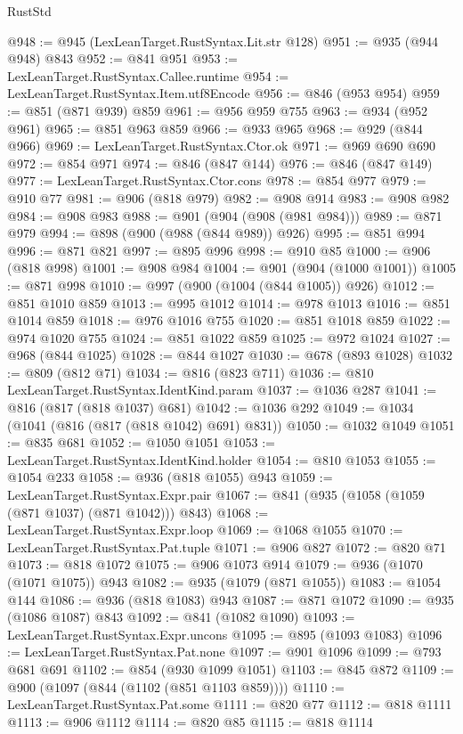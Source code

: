 \begin{lexlean}{RustStd}
\begin{coremodule}
@948 := @945 (LexLeanTarget.RustSyntax.Lit.str @128)
@951 := @935 (@944 @948) @843
@952 := @841 @951
@953 := LexLeanTarget.RustSyntax.Callee.runtime
@954 := LexLeanTarget.RustSyntax.Item.utf8Encode
@956 := @846 (@953 @954)
@959 := @851 (@871 @939) @859
@961 := @956 @959 @755
@963 := @934 (@952 @961)
@965 := @851 @963 @859
@966 := @933 @965
@968 := @929 (@844 @966)
@969 := LexLeanTarget.RustSyntax.Ctor.ok
@971 := @969 @690 @690
@972 := @854 @971
@974 := @846 (@847 @144)
@976 := @846 (@847 @149)
@977 := LexLeanTarget.RustSyntax.Ctor.cons
@978 := @854 @977
@979 := @910 @77
@981 := @906 (@818 @979)
@982 := @908 @914
@983 := @908 @982
@984 := @908 @983
@988 := @901 (@904 (@908 (@981 @984)))
@989 := @871 @979
@994 := @898 (@900 (@988 (@844 @989)) @926)
@995 := @851 @994
@996 := @871 @821
@997 := @895 @996
@998 := @910 @85
@1000 := @906 (@818 @998)
@1001 := @908 @984
@1004 := @901 (@904 (@1000 @1001))
@1005 := @871 @998
@1010 := @997 (@900 (@1004 (@844 @1005)) @926)
@1012 := @851 @1010 @859
@1013 := @995 @1012
@1014 := @978 @1013
@1016 := @851 @1014 @859
@1018 := @976 @1016 @755
@1020 := @851 @1018 @859
@1022 := @974 @1020 @755
@1024 := @851 @1022 @859
@1025 := @972 @1024
@1027 := @968 (@844 @1025)
@1028 := @844 @1027
@1030 := @678 (@893 @1028)
@1032 := @809 (@812 @71)
@1034 := @816 (@823 @711)
@1036 := @810 LexLeanTarget.RustSyntax.IdentKind.param
@1037 := @1036 @287
@1041 := @816 (@817 (@818 @1037) @681)
@1042 := @1036 @292
@1049 := @1034 (@1041 (@816 (@817 (@818 @1042) @691) @831))
@1050 := @1032 @1049
@1051 := @835 @681
@1052 := @1050 @1051
@1053 := LexLeanTarget.RustSyntax.IdentKind.holder
@1054 := @810 @1053
@1055 := @1054 @233
@1058 := @936 (@818 @1055) @943
@1059 := LexLeanTarget.RustSyntax.Expr.pair
@1067 := @841 (@935 (@1058 (@1059 (@871 @1037) (@871 @1042))) @843)
@1068 := LexLeanTarget.RustSyntax.Expr.loop
@1069 := @1068 @1055
@1070 := LexLeanTarget.RustSyntax.Pat.tuple
@1071 := @906 @827
@1072 := @820 @71
@1073 := @818 @1072
@1075 := @906 @1073 @914
@1079 := @936 (@1070 (@1071 @1075)) @943
@1082 := @935 (@1079 (@871 @1055))
@1083 := @1054 @144
@1086 := @936 (@818 @1083) @943
@1087 := @871 @1072
@1090 := @935 (@1086 @1087) @843
@1092 := @841 (@1082 @1090)
@1093 := LexLeanTarget.RustSyntax.Expr.uncons
@1095 := @895 (@1093 @1083)
@1096 := LexLeanTarget.RustSyntax.Pat.none
@1097 := @901 @1096
@1099 := @793 @681 @691
@1102 := @854 (@930 @1099 @1051)
@1103 := @845 @872
@1109 := @900 (@1097 (@844 (@1102 (@851 @1103 @859))))
@1110 := LexLeanTarget.RustSyntax.Pat.some
@1111 := @820 @77
@1112 := @818 @1111
@1113 := @906 @1112
@1114 := @820 @85
@1115 := @818 @1114

\end{coremodule}
\end{lexlean}
